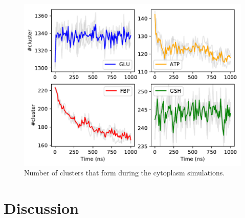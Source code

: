 \documentclass[journal=jacsat,manuscript=article]{achemso}
\begin{document}
\begin{figure}
\includegraphics[scale=0.6]{nclust.pdf}
\caption{Number of clusters that form during the cytoplasm simulations.}
\end{figure}









 
\section*{Discussion}\label{sec:dissc}
 




 

 
\end{document}
